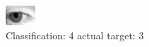 \begin{figure}[h!]
\begin{center}
\includegraphics[width=0.60\columnwidth]{figures/ID193_class_4_target_3.png}
\end{center}
\caption{ Classification: 4 actual target: 3}
\label{fig:ID193_class_4_target_3}
\end{figure}
